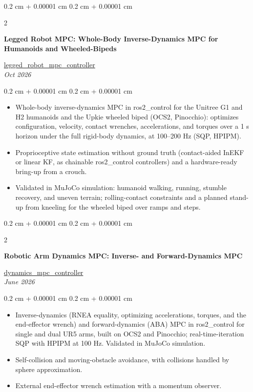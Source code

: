 \documentclass[10pt, letterpaper]{article}
\newenvironment{highlights}{
    \begin{itemize}[
        topsep=0.10 cm,
        parsep=0.10 cm,
        partopsep=0pt,
        itemsep=0pt,
        leftmargin=0.4 cm + 10pt
    ]
}{
    \end{itemize}
} %
\newenvironment{onecolentry}{
    \begin{adjustwidth}{
        0.2 cm + 0.00001 cm
    }{
        0.2 cm + 0.00001 cm
    }
}{
    \end{adjustwidth}
} %
\newenvironment{twocolentry}[2][4.5 cm]{
    \needspace{4\baselineskip}%
    \onecolentry
    \def\secondColumn{#2}
    \setcolumnwidth{\fill, #1}
    \begin{paracol}{2}
}{
    \switchcolumn \raggedleft \secondColumn
    \end{paracol}
    \endonecolentry
} %
\let\hrefWithoutArrow\href
\renewcommand{\href}[2]{\hrefWithoutArrow{#1}{\ifthenelse{\equal{#2}{}}{ }{#2 }\raisebox{.15ex}{\footnotesize \faExternalLink*}}}
\begin{document}
        \begin{twocolentry}[4.9 cm]{
        \hrefWithoutArrow{https://github.com/wei-hsuan-cheng/legged_robot_mpc_controller}{{\footnotesize\faGithub}\hspace*{0.13cm}legged\_robot\_mpc\_controller}\\\textit{Oct 2026}
        }
            \textbf{Legged Robot MPC: Whole-Body Inverse-Dynamics MPC for Humanoids and Wheeled-Bipeds}
        \end{twocolentry}
        \vspace{0.10 cm}
        \begin{onecolentry}
            \begin{highlights}
                \item Whole-body inverse-dynamics MPC in ros2\_control for the Unitree G1 and H2 humanoids and the Upkie wheeled biped (OCS2, Pinocchio): optimizes configuration, velocity, contact wrenches, accelerations, and torques over a 1 s horizon under the full rigid-body dynamics, at 100–200 Hz (SQP, HPIPM).
                \item Proprioceptive state estimation without ground truth (contact-aided InEKF or linear KF, as chainable ros2\_control controllers) and a hardware-ready bring-up from a crouch.
                \item Validated in MuJoCo simulation: humanoid walking, running, stumble recovery, and uneven terrain; rolling-contact constraints and a planned stand-up from kneeling for the wheeled biped over ramps and steps.
            \end{highlights}
        \end{onecolentry}
        \vspace{0.2 cm}

        \begin{twocolentry}[4.9 cm]{
        \hrefWithoutArrow{https://github.com/wei-hsuan-cheng/dynamics_mpc_controller}{{\footnotesize\faGithub}\hspace*{0.13cm}dynamics\_mpc\_controller}\\\textit{June 2026}
        }
            \textbf{Robotic Arm Dynamics MPC: Inverse- and Forward-Dynamics MPC}
        \end{twocolentry}
        \vspace{0.10 cm}
        \begin{onecolentry}
            \begin{highlights}
                \item Inverse-dynamics (RNEA equality, optimizing accelerations, torques, and the end-effector wrench) and forward-dynamics (ABA) MPC in ros2\_control for single and dual UR5 arms, built on OCS2 and Pinocchio; real-time-iteration SQP with HPIPM at 100 Hz. Validated in MuJoCo simulation.
                \item Self-collision and moving-obstacle avoidance, with collisions handled by sphere approximation.
                \item External end-effector wrench estimation with a momentum observer.
            \end{highlights}
        \end{onecolentry}
        \vspace{0.2 cm}
\end{document}
